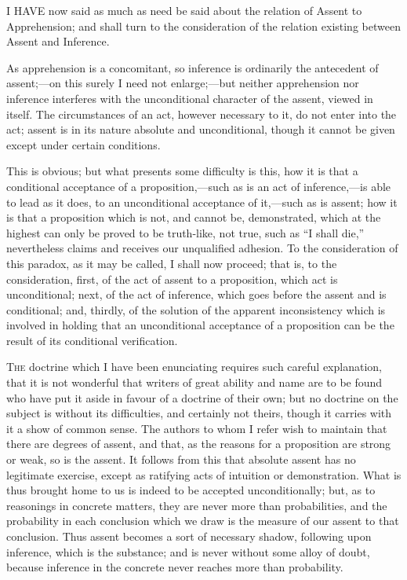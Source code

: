 
I HAVE now said as much as need be said about the relation of
Assent to Apprehension; and shall turn to the consideration of the
relation existing between Assent and Inference.

As apprehension is a concomitant, so inference is ordinarily the
antecedent of assent;—on this surely I need not enlarge;—but
neither apprehension nor inference interferes with the unconditional
character of the assent, viewed in itself. The circumstances of an
act, however necessary to it, do not enter into the act; assent is in
its nature absolute and unconditional, though it cannot be given
except under certain conditions.

This is obvious; but what presents some difficulty is this, how it
is that a conditional acceptance of a proposition,—such as is an act
of inference,—is able to lead as it does, to an unconditional
acceptance of it,—such as is assent; how it is that a proposition
which is not, and cannot be, demonstrated, which at the highest can
only be proved to be truth-like, not true, such as ``I shall
die,'' nevertheless claims and receives our unqualified adhesion.
To the consideration of this paradox, as it may be called, I shall now
proceed; that is, to the consideration, first, of the act of assent to
a proposition, which act is unconditional; next, of the act of
inference, which goes before the assent and is conditional; and,
thirdly, of the solution of the apparent inconsistency which is
involved in holding that an unconditional acceptance of a proposition
can be the result of its conditional verification.


T\textsc{he} doctrine which I have been enunciating requires such careful
explanation, that it is not wonderful that writers of great ability
and name are to be found who have put it aside in favour of a doctrine
of their own; but no doctrine on the subject is without its
difficulties, and certainly not theirs, though it carries with it a
show of common sense. The authors to whom I refer wish to maintain
that there are degrees of assent, and that, as the reasons for a
proposition are strong or weak, so is the assent. It follows from this
that absolute assent has no legitimate exercise, except as ratifying
acts of intuition or demonstration. What is thus brought home to us is
indeed to be accepted unconditionally; but, as to reasonings in
concrete matters, they are never more than probabilities, and the
probability in each conclusion which we draw is the measure of our
assent to that conclusion. Thus assent becomes a sort of necessary
shadow, following upon inference, which is the substance; and is never
without some alloy of doubt, because inference in the concrete never
reaches more than probability.

